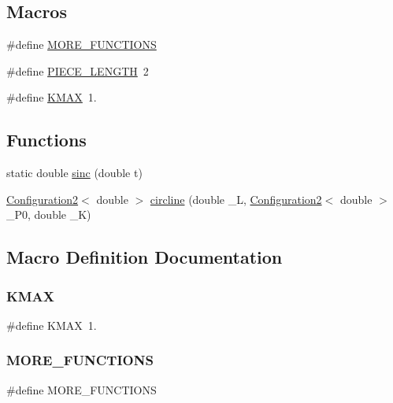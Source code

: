 \subsection*{Macros}
\begin{DoxyCompactItemize}
\item 
\#define \mbox{\hyperlink{dubins_8hh_a76156c41a8252ae92ac829a621c7bd0f}{M\+O\+R\+E\+\_\+\+F\+U\+N\+C\+T\+I\+O\+NS}}
\item 
\#define \mbox{\hyperlink{dubins_8hh_a5b2500ca93a5100f73dc442d3cfea7d4}{P\+I\+E\+C\+E\+\_\+\+L\+E\+N\+G\+TH}}~2
\item 
\#define \mbox{\hyperlink{dubins_8hh_a940b85a83458e94519f2685b33ddd276}{K\+M\+AX}}~1.
\end{DoxyCompactItemize}
\subsection*{Functions}
\begin{DoxyCompactItemize}
\item 
static double \mbox{\hyperlink{dubins_8hh_a5c88710b236a514392351a4d13d2e767}{sinc}} (double t)
\item 
\mbox{\hyperlink{class_configuration2}{Configuration2}}$<$ double $>$ \mbox{\hyperlink{dubins_8hh_adef8b363044d7fed558e5b47d8d6a3a0}{circline}} (double \+\_\+L, \mbox{\hyperlink{class_configuration2}{Configuration2}}$<$ double $>$ \+\_\+\+P0, double \+\_\+K)
\end{DoxyCompactItemize}


\subsection{Macro Definition Documentation}
\mbox{\label{dubins_8hh_a940b85a83458e94519f2685b33ddd276}} 
\subsubsection{\texorpdfstring{KMAX}{KMAX}}
{\footnotesize\ttfamily \#define K\+M\+AX~1.}

\mbox{\label{dubins_8hh_a76156c41a8252ae92ac829a621c7bd0f}} 
\subsubsection{\texorpdfstring{MORE\_FUNCTIONS}{MORE\_FUNCTIONS}}
{\footnotesize\ttfamily \#define M\+O\+R\+E\+\_\+\+F\+U\+N\+C\+T\+I\+O\+NS}

